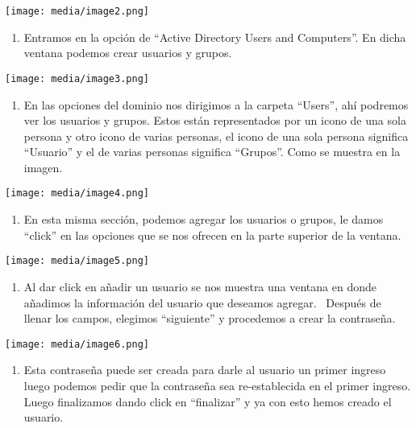 \documentclass[
]{article}
\begin{document}
\texttt{[image: media/image2.png]}

\begin{enumerate}
\def\labelenumi{\arabic{enumi}.}
\setcounter{enumi}{1}
\item
  Entramos en la opción de ``Active Directory Users and Computers''. En
  dicha ventana podemos crear usuarios y grupos.~
\end{enumerate}

\texttt{[image: media/image3.png]}

\begin{enumerate}
\def\labelenumi{\arabic{enumi}.}
\setcounter{enumi}{2}
\item
  En las opciones del dominio nos dirigimos a la carpeta ``Users'', ahí
  podremos ver los usuarios y grupos. Estos están representados por un
  icono de una sola persona y otro icono de varias personas, el icono de
  una sola persona significa ``Usuario'' y el de varias personas
  significa ``Grupos''. Como se muestra en la imagen.
\end{enumerate}

\texttt{[image: media/image4.png]}

\begin{enumerate}
\def\labelenumi{\arabic{enumi}.}
\setcounter{enumi}{3}
\item
  En esta misma sección, podemos agregar los usuarios o grupos, le damos
  ``click'' en las opciones que se nos ofrecen en la parte superior de
  la ventana.
\end{enumerate}

\texttt{[image: media/image5.png]}

\begin{enumerate}
\def\labelenumi{\arabic{enumi}.}
\setcounter{enumi}{4}
\item
  Al dar click en añadir un usuario se nos muestra una ventana en donde
  añadimos la información del usuario que deseamos agregar.~ Después de
  llenar los campos, elegimos ``siguiente'' y procedemos a crear la
  contraseña.~
\end{enumerate}

\texttt{[image: media/image6.png]}

\begin{enumerate}
\def\labelenumi{\arabic{enumi}.}
\setcounter{enumi}{5}
\item
  Esta contraseña puede ser creada para darle al usuario un primer
  ingreso luego podemos pedir que la contraseña sea re-establecida en el
  primer ingreso. Luego finalizamos dando click en ``finalizar'' y ya
  con esto hemos creado el usuario.
\end{enumerate}
\end{document}
